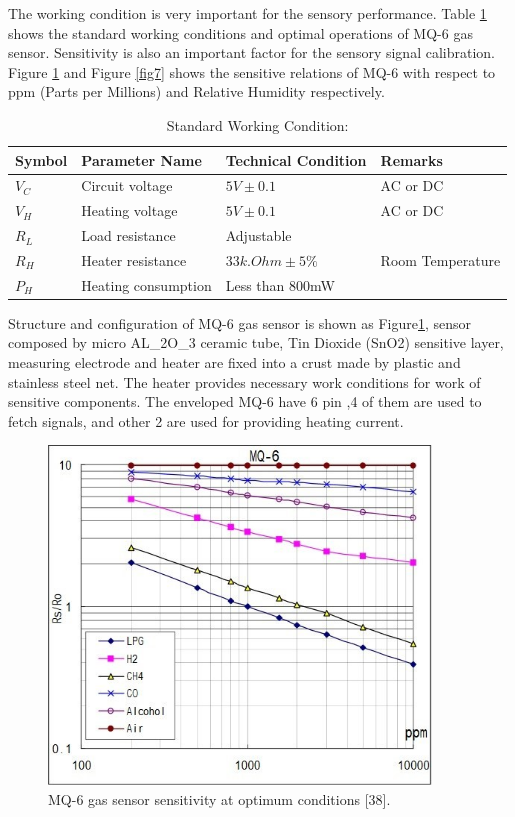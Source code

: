 The working condition is very important for the sensory performance. Table \ref{tab2} shows the standard working conditions and optimal operations of MQ-6 gas sensor. Sensitivity is also an important factor for the sensory signal calibration. Figure \ref{fig6} and Figure \ref{fig7} shows the sensitive relations of MQ-6 with respect to ppm (Parts per Millions) and Relative Humidity respectively.
\begin{table}[h]
  \caption{Standard Working Condition:}\label{tab2}
  \centering
  \begin{tabular}{|p{.5in}|p{1.5in}|p{1.5in}|p{1.5in}|}
    \hline
    Symbol & Parameter Name & Technical Condition & Remarks\\[1ex] \hline
     $V_C$ & Circuit voltage & $5V\pm0.1$ & AC or DC\\[1ex] \hline
     $V_H$ & Heating voltage & $5V\pm0.1$ & AC or DC\\[1ex] \hline
     $R_L$ & Load resistance & Adjustable & \\[1ex] \hline
     $R_H$ & Heater resistance & $33k.Ohm\pm5\%$ & Room Temperature\\[1ex] \hline
     $P_H$ & Heating consumption & Less than 800mW & \\[1ex]
    \hline
  \end{tabular}
\end{table}
Structure and configuration of MQ-6 gas sensor is shown as Figure\ref{fig6}, sensor composed by micro AL\_2O\_3 ceramic tube, Tin Dioxide (SnO2) sensitive layer, measuring electrode and heater are fixed into a crust made by plastic and stainless steel net. The heater provides necessary work conditions for work of sensitive components. The enveloped MQ-6 have 6 pin ,4 of them are used to fetch signals, and other 2 are used for providing heating current.
\begin{figure}[h]
  \centering
  \includegraphics[width=4in]{6}
  \caption{MQ-6 gas sensor sensitivity at optimum conditions [38].}\label{fig6}
\end{figure}

